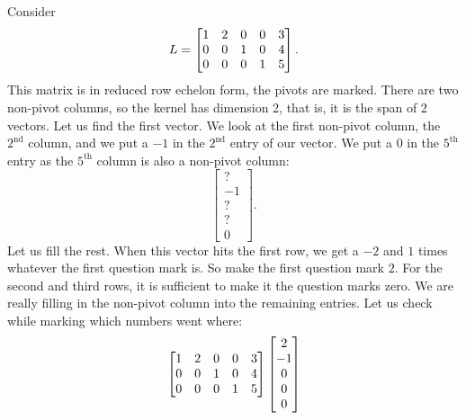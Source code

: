 \documentclass{ximera}
\begin{document}
\begin{example}
    Consider
    \begin{equation*}
        L = 
        \begin{bmatrix}
            1 & 2 & 0 & 0 & 3 \\
            0 & 0 & 1 & 0 & 4 \\
            0 & 0 & 0 & 1 & 5
        \end{bmatrix} .
    \end{equation*}
    This matrix is in reduced row echelon form, the pivots are marked. There are two non-pivot columns, so the kernel has dimension 2, that is, it is the span of 2 vectors.  Let us find the first vector. We look at the first non-pivot column, the $2^{\text{nd}}$ column, and we put a $-1$ in the $2^{\text{nd}}$ entry of our vector.  We put a $0$ in the $5^{\text{th}}$ entry as the $5^{\text{th}}$ column is also a non-pivot column:
    \begin{equation*}
        \begin{bmatrix}
            ? \\ 
            -1 \\ 
            ? \\ 
            ? \\ 
            0
        \end{bmatrix} .
    \end{equation*}
    Let us fill the rest.  When this vector hits the first row, we get a $-2$ and $1$ times whatever the first question mark is.  So make the first question mark $2$.  For the second and third rows, it is sufficient to make it the question marks zero.  We are really filling in the non-pivot column into the remaining entries. Let us check while marking which numbers went where:
    \begin{equation*}
        \begin{bmatrix}
            1 & \mybxsm{2} & 0 & 0 & 3 \\
            0 & \mybxsm{0} & 1 & 0 & 4 \\
            0 & \mybxsm{0} & 0 & 1 & 5
        \end{bmatrix} 
        \begin{bmatrix}
            \mybxsm{2} \\ 
            -1 \\ 
            \mybxsm{0} \\ 
            \mybxsm{0} \\ 
            0
        \end{bmatrix}

\end{equation*}
\end{example}
\end{document}
